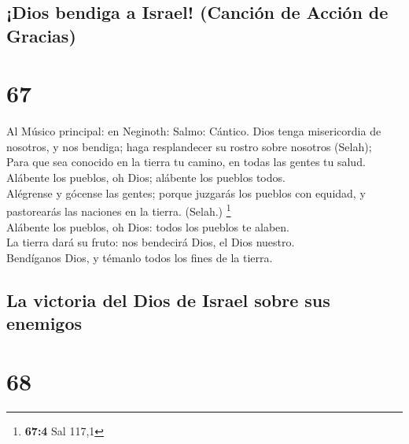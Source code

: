 \hypertarget{dios-bendiga-a-israel-canciuxf3n-de-acciuxf3n-de-gracias}{%
\subsection{¡Dios bendiga a Israel! (Canción de Acción de
Gracias)}\label{dios-bendiga-a-israel-canciuxf3n-de-acciuxf3n-de-gracias}}

\hypertarget{section-66}{%
\section{67}\label{section-66}}

 Al Músico principal: en Neginoth: Salmo: Cántico. Dios
tenga misericordia de nosotros, y nos bendiga; haga resplandecer su
rostro sobre nosotros (Selah);\\
 Para que sea conocido en la tierra tu camino, en todas
las gentes tu salud.\\
 Alábente los pueblos, oh Dios; alábente los pueblos
todos.\\
 Alégrense y gócense las gentes; porque juzgarás los
pueblos con equidad, y pastorearás las naciones en la tierra. (Selah.)
\footnote{\textbf{67:4} Sal 117,1}\\
 Alábente los pueblos, oh Dios: todos los pueblos te
alaben.\\
 La tierra dará su fruto: nos bendecirá Dios, el Dios
nuestro.\\
 Bendíganos Dios, y témanlo todos los fines de la tierra.

\hypertarget{la-victoria-del-dios-de-israel-sobre-sus-enemigos}{%
\subsection{La victoria del Dios de Israel sobre sus
enemigos}\label{la-victoria-del-dios-de-israel-sobre-sus-enemigos}}

\hypertarget{section-67}{%
\section{68}\label{section-67}}

